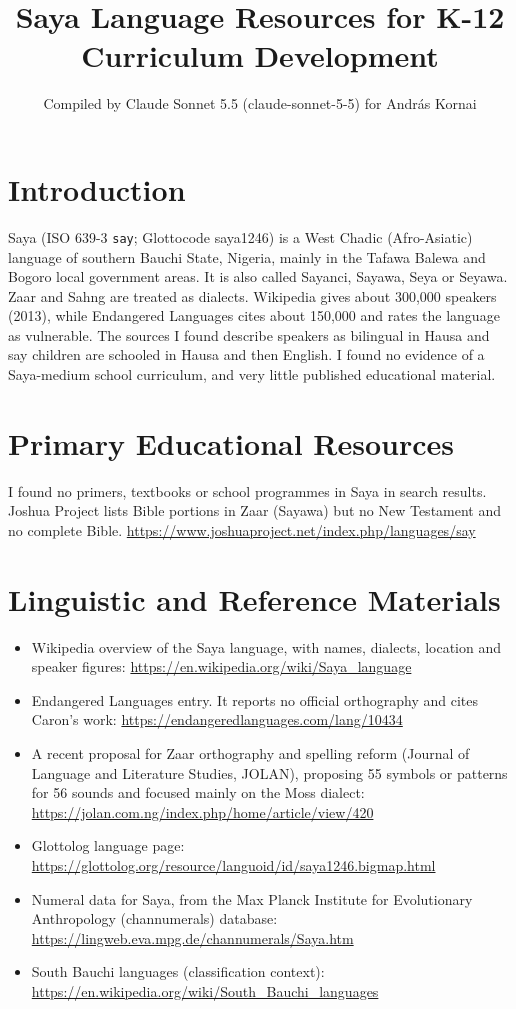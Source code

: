 \documentclass[12pt]{article}
\title{Saya Language Resources for K-12 Curriculum Development}
\author{Compiled by Claude Sonnet 5.5 (claude-sonnet-5-5) for Andr\'as Kornai}
\date{}
\begin{document}
\maketitle

\section{Introduction}
Saya (ISO 639-3 \texttt{say}; Glottocode saya1246) is a West Chadic (Afro-Asiatic) language of southern Bauchi State, Nigeria, mainly in the Tafawa Balewa and Bogoro local government areas. It is also called Sayanci, Sayawa, Seya or Seyawa. Zaar and Sahng are treated as dialects. Wikipedia gives about 300,000 speakers (2013), while Endangered Languages cites about 150,000 and rates the language as vulnerable. The sources I found describe speakers as bilingual in Hausa and say children are schooled in Hausa and then English. I found no evidence of a Saya-medium school curriculum, and very little published educational material.

\section{Primary Educational Resources}
I found no primers, textbooks or school programmes in Saya in search results. Joshua Project lists Bible portions in Zaar (Sayawa) but no New Testament and no complete Bible. \url{https://www.joshuaproject.net/index.php/languages/say}

\section{Linguistic and Reference Materials}
\begin{itemize}
\item Wikipedia overview of the Saya language, with names, dialects, location and speaker figures: \url{https://en.wikipedia.org/wiki/Saya_language}
\item Endangered Languages entry. It reports no official orthography and cites Caron's work: \url{https://endangeredlanguages.com/lang/10434}
\item A recent proposal for Zaar orthography and spelling reform (Journal of Language and Literature Studies, JOLAN), proposing 55 symbols or patterns for 56 sounds and focused mainly on the Moss dialect: \url{https://jolan.com.ng/index.php/home/article/view/420}
\item Glottolog language page: \url{https://glottolog.org/resource/languoid/id/saya1246.bigmap.html}
\item Numeral data for Saya, from the Max Planck Institute for Evolutionary Anthropology (channumerals) database: \url{https://lingweb.eva.mpg.de/channumerals/Saya.htm}
\item South Bauchi languages (classification context): \url{https://en.wikipedia.org/wiki/South_Bauchi_languages}
\end{itemize}
\end{document}
